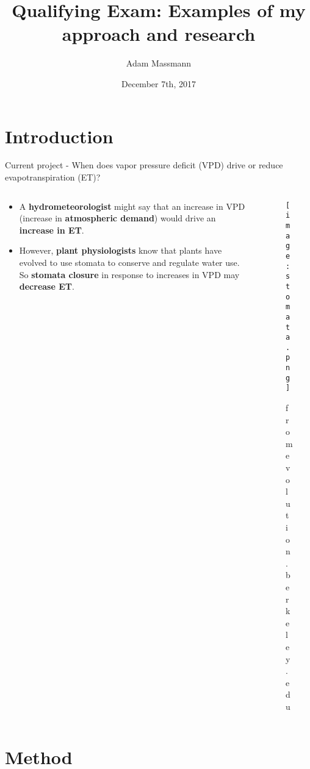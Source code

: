 \documentclass{beamer}
\title[Your Short Title]{Qualifying Exam: Examples of my approach and research}
\author{Adam Massmann}
\date{December 7th, 2017}
\begin{document}
\begin{frame}
  \titlepage
\end{frame}


\section{Introduction}
\begin{frame}{Current project - When does vapor pressure deficit (VPD) drive or reduce evapotranspiration (ET)?}
  \begin{columns}[T,onlytextwidth]
    \begin{column}{0.5\textwidth}
      \begin{minipage}{\textwidth}
        \begin{itemize}
        \item A \textbf{hydrometeorologist} might say that an increase in VPD (increase in \textbf{atmospheric demand}) would drive an \textbf{increase in ET}.
        \item However, \textbf{plant physiologists} know that plants have evolved to use stomata to conserve and regulate water use. So \textbf{stomata closure} in response to increases in VPD may \textbf{decrease ET}.
        \end{itemize}
      \end{minipage}
    \end{column}
    \begin{column}{0.5\textwidth}
      \begin{minipage}{\textwidth}
        \begin{figure}
          \texttt{[image: stomata.png]}%
          \caption{from evolution.berkeley.edu}
        \end{figure}
      \end{minipage}
    \end{column}
  \end{columns}
\end{frame}

\section{Method}
\end{document}
